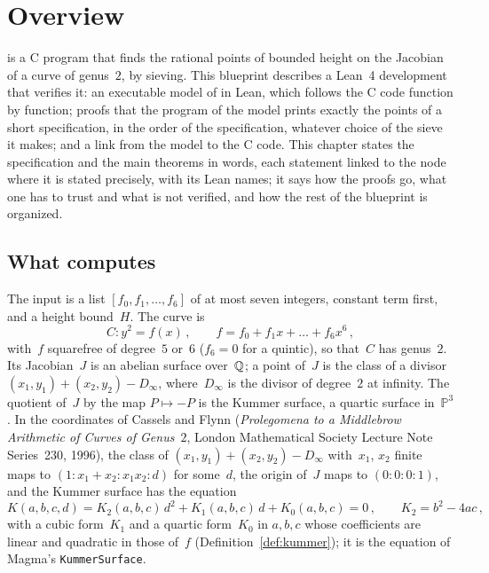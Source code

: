 \chapter{Overview}\label{chap:overview}

\jpoints{} is a C program that finds the rational points of bounded height on the Jacobian of a
curve of genus~$2$, by sieving. This blueprint describes a Lean~4 development that verifies it: an
executable model of \jpoints{} in Lean, which follows the C code function by function; proofs that
the program of the model prints exactly the points of a short specification, in the order of the
specification, whatever choice of the sieve it makes; and a link from the model to the C code. This
chapter states the specification and the main theorems in words, each statement linked to the node
where it is stated precisely, with its Lean names; it says how the proofs go, what one has to trust
and what is not verified, and how the rest of the blueprint is organized.

\section{What \jpoints{} computes}\label{sec:overviewJpoints}

The input is a list $[f_0, f_1, \dots, f_6]$ of at most seven integers, constant term first, and a
height bound~$H$. The curve is
\[ C \colon y^2 = f(x)\,, \qquad f = f_0 + f_1 x + \dots + f_6 x^6\,, \]
with~$f$ squarefree of degree~$5$ or~$6$ ($f_6 = 0$ for a quintic), so that~$C$ has genus~$2$. Its
Jacobian~$J$ is an abelian surface over~$\mathbb{Q}$; a point of~$J$ is the class of a divisor $(x_1, y_1)
+ (x_2, y_2) - D_\infty$, where~$D_\infty$ is the divisor of degree~$2$ at infinity. The quotient
of~$J$ by the map $P \mapsto -P$ is the Kummer surface, a quartic surface in~$\mathbb{P}^3$. In the
coordinates of Cassels and Flynn (\emph{Prolegomena to a Middlebrow Arithmetic of Curves of
Genus~$2$}, London Mathematical Society Lecture Note Series~230, 1996), the class of $(x_1, y_1) +
(x_2, y_2) - D_\infty$ with~$x_1$, $x_2$ finite maps to $(1 : x_1 + x_2 : x_1 x_2 : d)$ for
some~$d$, the origin of~$J$ maps to $(0 : 0 : 0 : 1)$, and the Kummer surface has the equation
\[ K(a, b, c, d) = K_2(a, b, c)\, d^2 + K_1(a, b, c)\, d + K_0(a, b, c) = 0\,, \qquad
   K_2 = b^2 - 4ac\,, \]
with a cubic form~$K_1$ and a quartic form~$K_0$ in $a, b, c$ whose coefficients are linear and
quadratic in those of~$f$ (Definition~\ref{def:kummer}); it is the equation of Magma's
\texttt{KummerSurface}.

